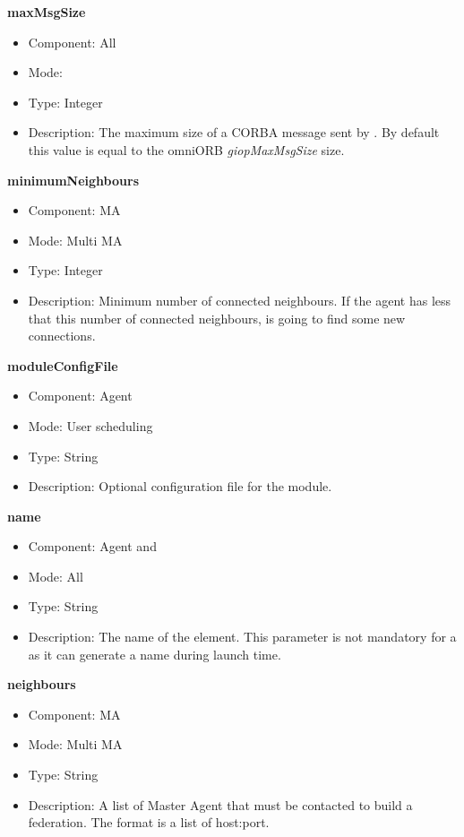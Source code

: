 \begin{description}
\item{\bf{maxMsgSize}}
  \begin{itemize}
  \item Component: All
  \item Mode: \dagda
  \item Type: Integer
  \item Description: The maximum size of a CORBA message sent by \dagda. By
  default this value is equal to the omniORB \textit{giopMaxMsgSize} size.
  \end{itemize}

\item{\bf{minimumNeighbours}}
  \begin{itemize}
  \item Component: MA
  \item Mode: Multi MA
  \item Type: Integer
  \item Description: Minimum number of connected neighbours. If the
    agent has less that this number of connected neighbours, is going to
    find some new connections. 
  \end{itemize}

\item{\bf{moduleConfigFile}}
  \begin{itemize}
  \item Component: Agent
  \item Mode: User scheduling
  \item Type: String
  \item Description: Optional configuration file for the module.
  \end{itemize}

\item{\bf{name}}
  \begin{itemize}
  \item Component: Agent and \sed
  \item Mode: All
  \item Type: String
  \item Description: The name of the element. This parameter is not mandatory
    for a \sed as it can generate a name during launch time.
  \end{itemize}

\item{\bf{neighbours}}
  \begin{itemize}
  \item Component: MA
  \item Mode: Multi MA
  \item Type: String
  \item Description: A list of Master Agent that must be contacted to
    build a federation. The format is a list of host:port.
  \end{itemize}


\end{description}
